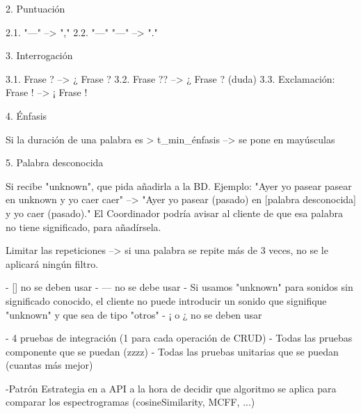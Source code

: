 2. Puntuación

    2.1. "---" --> ","
    2.2. "---" "---" --> "."

3. Interrogación

    3.1. Frase ? --> ¿ Frase ?
    3.2. Frase ?? --> ¿ Frase ? (duda)
    3.3. Exclamación: Frase ! --> ¡ Frase !

4. Énfasis

    Si la duración de una palabra es > t_min_énfasis --> se pone en mayúsculas

5. Palabra desconocida

    Si recibe "unknown", que pida añadirla a la BD.
    Ejemplo: "Ayer yo pasear pasear en unknown y yo caer caer" --> "Ayer yo pasear (pasado) en [palabra desconocida] y yo caer (pasado)." El Coordinador podría avisar al cliente de que esa palabra no tiene significado, para añadírsela.

Limitar las repeticiones --> si una palabra se repite más de 3 veces, no se le aplicará ningún filtro. 




- [] no se deben usar
- ---  no se debe usar 
- Si usamos "unknown" para sonidos sin significado conocido, el cliente no puede introducir un sonido que signifique "unknown" y que sea de tipo "otros"
- ¡ o ¿ no se deben usar



- 4 pruebas de integración (1 para cada operación de CRUD) 
- Todas las pruebas componente que se puedan (zzzz)
- Todas las pruebas unitarias que se puedan (cuantas más mejor)




-Patrón Estrategia en a API a la hora de decidir que algoritmo se aplica para
comparar los espectrogramas (cosineSimilarity, MCFF, ...)

